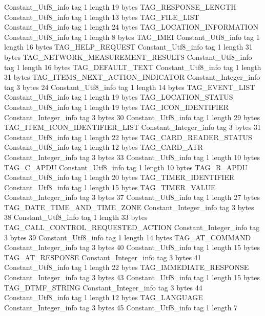 {{{		}
		Constant_Utf8_info {
			tag	1
			length	19
			bytes	TAG_RESPONSE_LENGTH
		}
		Constant_Utf8_info {
			tag	1
			length	13
			bytes	TAG_FILE_LIST
		}
		Constant_Utf8_info {
			tag	1
			length	24
			bytes	TAG_LOCATION_INFORMATION
		}
		Constant_Utf8_info {
			tag	1
			length	8
			bytes	TAG_IMEI
		}
		Constant_Utf8_info {
			tag	1
			length	16
			bytes	TAG_HELP_REQUEST
		}
		Constant_Utf8_info {
			tag	1
			length	31
			bytes	TAG_NETWORK_MEASUREMENT_RESULTS
		}
		Constant_Utf8_info {
			tag	1
			length	16
			bytes	TAG_DEFAULT_TEXT
		}
		Constant_Utf8_info {
			tag	1
			length	31
			bytes	TAG_ITEMS_NEXT_ACTION_INDICATOR
		}
		Constant_Integer_info {
			tag	3
			bytes	24
		}
		Constant_Utf8_info {
			tag	1
			length	14
			bytes	TAG_EVENT_LIST
		}
		Constant_Utf8_info {
			tag	1
			length	19
			bytes	TAG_LOCATION_STATUS
		}
		Constant_Utf8_info {
			tag	1
			length	19
			bytes	TAG_ICON_IDENTIFIER
		}
		Constant_Integer_info {
			tag	3
			bytes	30
		}
		Constant_Utf8_info {
			tag	1
			length	29
			bytes	TAG_ITEM_ICON_IDENTIFIER_LIST
		}
		Constant_Integer_info {
			tag	3
			bytes	31
		}
		Constant_Utf8_info {
			tag	1
			length	22
			bytes	TAG_CARD_READER_STATUS
		}
		Constant_Utf8_info {
			tag	1
			length	12
			bytes	TAG_CARD_ATR
		}
		Constant_Integer_info {
			tag	3
			bytes	33
		}
		Constant_Utf8_info {
			tag	1
			length	10
			bytes	TAG_C_APDU
		}
		Constant_Utf8_info {
			tag	1
			length	10
			bytes	TAG_R_APDU
		}
		Constant_Utf8_info {
			tag	1
			length	20
			bytes	TAG_TIMER_IDENTIFIER
		}
		Constant_Utf8_info {
			tag	1
			length	15
			bytes	TAG_TIMER_VALUE
		}
		Constant_Integer_info {
			tag	3
			bytes	37
		}
		Constant_Utf8_info {
			tag	1
			length	27
			bytes	TAG_DATE_TIME_AND_TIME_ZONE
		}
		Constant_Integer_info {
			tag	3
			bytes	38
		}
		Constant_Utf8_info {
			tag	1
			length	33
			bytes	TAG_CALL_CONTROL_REQUESTED_ACTION
		}
		Constant_Integer_info {
			tag	3
			bytes	39
		}
		Constant_Utf8_info {
			tag	1
			length	14
			bytes	TAG_AT_COMMAND
		}
		Constant_Integer_info {
			tag	3
			bytes	40
		}
		Constant_Utf8_info {
			tag	1
			length	15
			bytes	TAG_AT_RESPONSE
		}
		Constant_Integer_info {
			tag	3
			bytes	41
		}
		Constant_Utf8_info {
			tag	1
			length	22
			bytes	TAG_IMMEDIATE_RESPONSE
		}
		Constant_Integer_info {
			tag	3
			bytes	43
		}
		Constant_Utf8_info {
			tag	1
			length	15
			bytes	TAG_DTMF_STRING
		}
		Constant_Integer_info {
			tag	3
			bytes	44
		}
		Constant_Utf8_info {
			tag	1
			length	12
			bytes	TAG_LANGUAGE
		}
		Constant_Integer_info {
			tag	3
			bytes	45
		}
		Constant_Utf8_info {
			tag	1
			length	7
}}}
